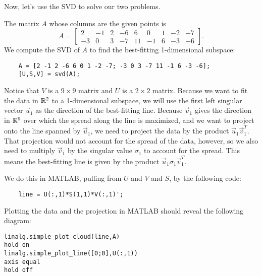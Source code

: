 \documentclass{ximera}
\begin{document}
Now, let's use the SVD to solve our two problems.

\begin{problem}
  The matrix $A$ whose columns are the given points is
  \begin{equation*}
    A = \begin{bmatrix}
      2 & -1 & 2 & -6 & 6 & 0 & 1 & -2 & -7 \\
      -3 & 0 & 3 & -7 & 11 & -1 & 6 & -3 & -6
    \end{bmatrix}.
  \end{equation*}
  We compute the SVD of $A$ to find the best-fitting 1-dimensional subspace:

  \begin{verbatim}
    A = [2 -1 2 -6 6 0 1 -2 -7; -3 0 3 -7 11 -1 6 -3 -6];
    [U,S,V] = svd(A);
  \end{verbatim}

  Notice that $V$ is a $9\times 9$ matrix and $U$ is a $2\times 2$ matrix. Because we want to fit the data in $\mathbb{R}^2$ to a 1-dimensional subspace, we will use the first left singular vector $\vec{u}_1$ as the direction of the best-fitting line. Because $\vec{v}_1$ gives the direction in $\mathbb{R}^9$ over which the spread along the line is maximized, and we want to project onto the line spanned by $\vec{u}_1$, we need to project the data by the product $\vec{u}_1\vec{v}_1^T$. That projection would not account for the spread of the data, however, so we also need to multiply $\vec{v}_1$ by the singular value $\sigma_1$ to account for the spread. This means the best-fitting line is given by the product $\vec{u}_1\sigma_1\vec{v}_1^T$.

  We do this in MATLAB, pulling from $U$ and $V$ and $S$, by the following code:

  \begin{verbatim}
    line = U(:,1)*S(1,1)*V(:,1)';
  \end{verbatim}

  Plotting the data and the projection in MATLAB should reveal the following diagram:

  \begin{verbatim}
linalg.simple_plot_cloud(line,A)
hold on
linalg.simple_plot_line([0;0],U(:,1))
axis equal
hold off
  \end{verbatim}

  \begin{center}
  \end{center}


\end{problem}
\end{document}
